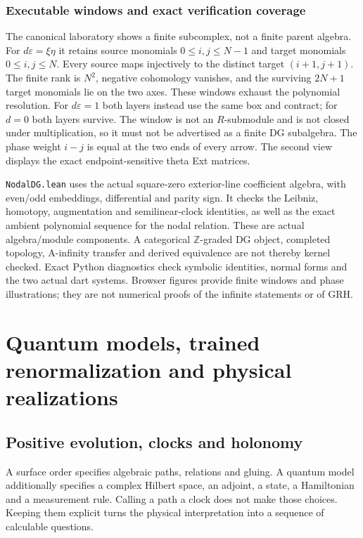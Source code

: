 \documentclass[11pt,oneside,openany]{book}
\theoremstyle{definition}\newtheorem{definition}[theorem]{Definition}
\theoremstyle{remark}\newtheorem{remark}[theorem]{Remark}
\begin{document}
\section{Executable windows and exact verification coverage}
The canonical laboratory shows a finite subcomplex, not a finite parent
algebra. For $d\varepsilon=\xi\eta$ it retains source monomials
$0\le i,j\le N-1$ and target monomials $0\le i,j\le N$.
Every source maps injectively to the distinct target $(i+1,j+1)$.
The finite rank is $N^2$, negative cohomology vanishes, and the surviving
$2N+1$ target monomials lie on the two axes. These windows exhaust the
polynomial resolution. For $d\varepsilon=1$ both layers instead use the
same box and contract; for $d=0$ both layers survive. The window is not an $R$-submodule and is not
closed under multiplication, so it must not be advertised as a finite DG
subalgebra. The phase weight $i-j$ is equal at the two ends of every arrow.
The second view displays the exact endpoint-sensitive theta Ext matrices.

\texttt{NodalDG.lean} uses the actual square-zero exterior-line coefficient
algebra, with even/odd embeddings, differential and parity sign. It checks
the Leibniz, homotopy, augmentation and semilinear-clock identities, as well
as the exact ambient polynomial sequence for the nodal relation. These are
actual algebra/module components. A categorical $\mathbb Z$-graded DG object,
completed topology, A-infinity transfer and derived equivalence are not
thereby kernel checked. Exact Python diagnostics check symbolic identities,
normal forms and the two actual dart systems. Browser figures provide finite
windows and phase illustrations; they are not numerical proofs of the
infinite statements or of GRH.

\part{Quantum models, trained renormalization and physical realizations}
\chapter{Positive evolution, clocks and holonomy}
\label{phys:operators}

A surface order specifies algebraic paths, relations and gluing. A quantum
model additionally specifies a complex Hilbert space, an adjoint, a state,
a Hamiltonian and a measurement rule. Calling a path a clock does not
make those choices. Keeping them explicit turns the physical interpretation
into a sequence of calculable questions.
\end{document}
